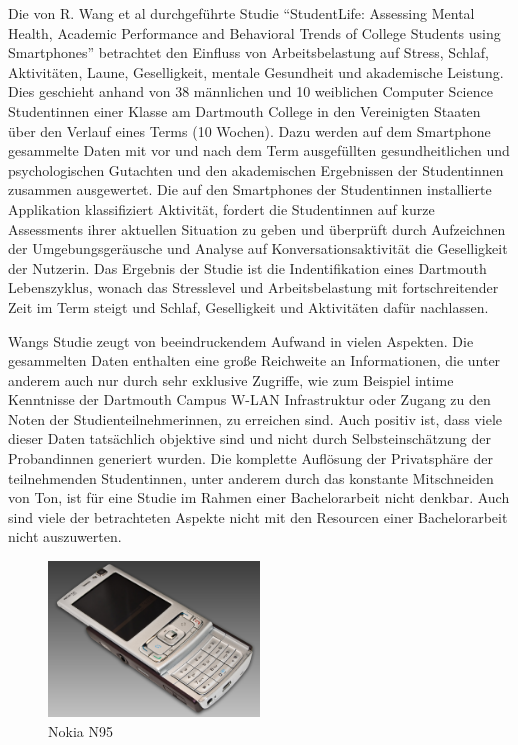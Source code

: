 Die von R. Wang et al durchgeführte Studie "`StudentLife: Assessing Mental Health, Academic Performance and Behavioral Trends of College Students using Smartphones"'
betrachtet den Einfluss von Arbeitsbelastung auf Stress, Schlaf, Aktivitäten, Laune, Geselligkeit, mentale Gesundheit und akademische Leistung.
Dies geschieht anhand von 38 männlichen und 10 weiblichen Computer Science Studentinnen einer Klasse am Dartmouth College in den Vereinigten Staaten über den Verlauf eines Terms (10 Wochen).
Dazu werden auf dem Smartphone gesammelte Daten mit vor und nach dem Term ausgefüllten gesundheitlichen und psychologischen Gutachten und den akademischen Ergebnissen der Studentinnen zusammen ausgewertet.
Die auf den Smartphones der Studentinnen installierte Applikation klassifiziert Aktivität, fordert die Studentinnen auf kurze Assessments ihrer aktuellen Situation zu geben und überprüft durch Aufzeichnen der Umgebungsgeräusche und Analyse auf Konversationsaktivität die Geselligkeit der Nutzerin.
Das Ergebnis der Studie ist die Indentifikation eines Dartmouth Lebenszyklus, wonach das Stresslevel und Arbeitsbelastung mit fortschreitender Zeit im Term steigt und Schlaf, Geselligkeit und Aktivitäten dafür nachlassen.
\par
Wangs Studie zeugt von beeindruckendem Aufwand in vielen Aspekten. 
Die gesammelten Daten enthalten eine große Reichweite an Informationen, die unter anderem auch nur durch sehr exklusive Zugriffe, wie zum Beispiel intime Kenntnisse der Dartmouth Campus W-LAN Infrastruktur oder Zugang zu den Noten der Studienteilnehmerinnen, zu erreichen sind.
Auch positiv ist, dass viele dieser Daten tatsächlich objektive sind und nicht durch Selbsteinschätzung der Probandinnen generiert wurden.
Die komplette Auflösung der Privatsphäre der teilnehmenden Studentinnen, unter anderem durch das konstante Mitschneiden von Ton, ist für eine Studie im Rahmen einer Bachelorarbeit nicht denkbar. 
Auch sind viele der betrachteten Aspekte nicht mit den Resourcen einer Bachelorarbeit nicht auszuwerten.



\begin{figure}[h]
    \centering
    \includegraphics[width=0.5\textwidth]{images/N95_Front-slide-open}
    \caption{Nokia N95\cite{nokiaPhone}}
    \label{nokia}
\end{figure}

